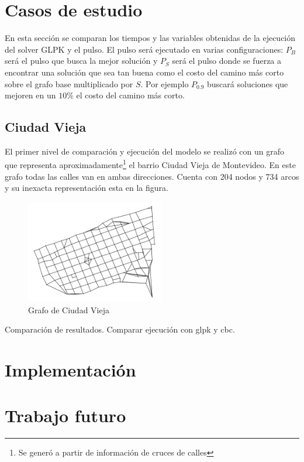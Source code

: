 \documentclass{article}
\begin{document}
  \section*{Casos de estudio}

  En esta sección se comparan los tiempos y las variables obtenidas de la ejecución del solver GLPK y el pulso. El pulso será ejecutado en varias configuraciones: $P_B$ será el pulso que busca la mejor solución y $P_S$ será el pulso donde se fuerza a encontrar una solución que sea tan buena como el costo del camino más corto sobre el grafo base multiplicado por $S$. Por ejemplo $P_{0.9}$ buscará soluciones que mejoren en un $10\%$ el costo del camino más corto.

  \subsection*{Ciudad Vieja}

  El primer nivel de comparación y ejecución del modelo se realizó con un grafo que representa aproximadamente\footnote{Se generó a partir de información de cruces de calles} el barrio Ciudad Vieja de Montevideo. En este grafo todas las calles van en ambas direcciones. Cuenta con 204 nodos y 734 arcos y su inexacta representación esta en la figura.

  \begin{figure}[]
    \centering
    \includegraphics[width=6cm]{imgs/mdeo_med.png}
    \caption{Grafo de Ciudad Vieja}
    \label{ciudadvieja}
  \end{figure}

  Comparación de resultados.
  Comparar ejecución con glpk y cbc.

  \section*{Implementación}

  \section*{Trabajo futuro}
\end{document}
